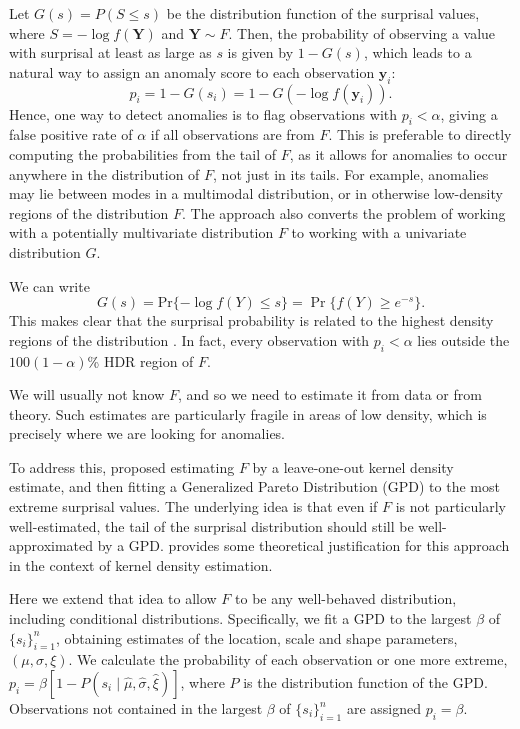 \documentclass[a4paper,11pt]{article}
\begin{document}
Let $G(s) = P(S\le s)$ be the distribution function of the surprisal values, where $S = -\log f(\bm{Y})$ and $\bm{Y}\sim F$. Then, the probability of observing a value with surprisal at least as large as $s$ is given by $1-G(s)$, which leads to a natural way to assign an anomaly score to each observation $\bm{y}_i$:
$$
	p_i = 1-G(s_i) = 1-G(-\log f(\bm{y}_i)).
$$
Hence, one way to detect anomalies is to flag observations with $p_i < \alpha$, giving a false positive rate of $\alpha$ if all observations are from $F$. This is preferable to directly computing the probabilities from the tail of $F$, as it allows for anomalies to occur anywhere in the distribution of $F$, not just in its tails. For example, anomalies may lie between modes in a multimodal distribution, or in otherwise low-density regions of the distribution $F$. The approach also converts the problem of working with a potentially multivariate distribution $F$ to working with a univariate distribution $G$.

We can write
$$
	G(s) = \mathrm{Pr}\{-\log f(Y)\le s\} = \Pr\{ f(Y)\ge e^{-s}\}.
$$
This makes clear that the surprisal probability is related to the highest density regions of the distribution \citep{HDR96}. In fact, every observation with $p_i< \alpha$ lies outside the $100(1-\alpha)$\% HDR region of $F$.

We will usually not know $F$, and so we need to estimate it from data or from theory. Such estimates are particularly fragile in areas of low density, which is precisely where we are looking for anomalies.

To address this, \citet{lookout} proposed estimating $F$ by a leave-one-out kernel density estimate, and then fitting a Generalized Pareto Distribution (GPD) to the most extreme surprisal values. The underlying idea is that even if $F$ is not particularly well-estimated, the tail of the surprisal distribution should still be well-approximated by a GPD. \citet{lookout2} provides some theoretical justification for this approach in the context of kernel density estimation.

Here we extend that idea to allow $F$ to be any well-behaved distribution, including conditional distributions. Specifically, we fit a GPD to the largest $\beta$ of $\{s_i\}_{i=1}^n$, obtaining estimates of the location, scale and shape parameters, $(\mu,\sigma,\xi)$. We calculate the probability of each observation or one more extreme, $p_i = \beta\left[1-P(s_i \mid \hat\mu, \hat\sigma, \hat\xi)\right]$, where $P$ is the distribution function of the GPD. Observations not contained in the largest $\beta$ of $\{s_i\}_{i=1}^n$ are assigned $p_i = \beta$.
\end{document}
